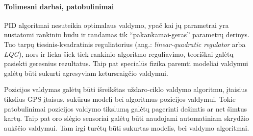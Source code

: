 \documentclass[12pt, a4paper, lithuanian, final]{article}
\begin{document}
\paragraph{Tolimesni darbai, patobulinimai}

PID algoritmai nesuteikia optimalaus valdymo, ypač kai jų parametrai yra nustatomi rankiniu būdu ir randamas tik "`pakankamai-geras"' parametrų derinys.
Tuo tarpų tiesinis-kvadratinis reguliatorius (ang.: \textit{linear-quadratic regulator} arba \textit{LQG}), nors ir lieka šiek tiek rankinio algoritmo reguliavimo, teoriškai galėtų pasiekti geresnius rezultatus.
Taip pat specialūs fizika paremti modeliai valdymui galėtų būti sukurti agresyviam ketursraigčio valdymui.

Pozicijos valdymas galėtų būti išreikštas uždaro-ciklo valdymo algoritmu, įtaisius tikslius GPS įtaisus, sukūrus modelį bei algoritmus pozicijos valdymui.
Tokie patobulinimai pozicijos valdymo tikslumą galėtų pagerinti dešimtis ar net šimtus kartų.
Taip pat oro slėgio sensoriai galėtų būti naudojami automatiniam skrydžio aukščio valdymui.
Tam irgi turėtų būti sukurtas modelis, bei valdymo algoritmai.



\end{document}
